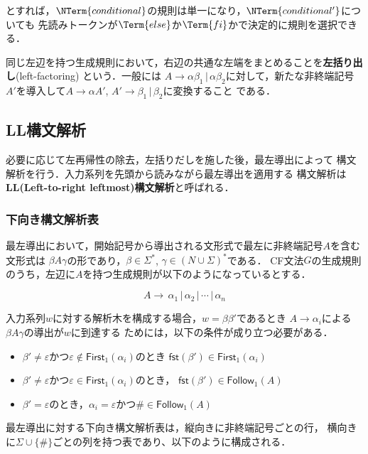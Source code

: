\documentclass[dvipdfmx,a4j]{jbook}
\begin{document}
とすれば，$\NTerm{conditional}$の規則は単一になり，$\NTerm{conditional'}$についても
先読みトークンが$\Term{else}$か$\Term{fi}$かで決定的に規則を選択できる．

同じ左辺を持つ生成規則において，右辺の共通な左端をまとめることを{\bf 左括り出し}(left-factoring)
という．一般には $A\rightarrow \alpha\beta_1\,|\,\alpha\beta_2$に対して，新たな非終端記号
$A'$を導入して$A\rightarrow \alpha A'$, $A'\rightarrow\beta_1\,|\,\beta_2$に変換すること
である．

\subsection{LL構文解析}

必要に応じて左再帰性の除去，左括りだしを施した後，最左導出によって
構文解析を行う．入力系列を先頭から読みながら最左導出を適用する
構文解析は{\bf LL(Left-to-right leftmost)構文解析}と呼ばれる．

\subsubsection{下向き構文解析表}

最左導出において，開始記号から導出される文形式で最左に非終端記号$A$を含む文形式は
$\beta A\gamma$の形であり，$\beta\in\Sigma^\ast$, $\gamma\in(N\cup\Sigma)^\ast$である．
CF文法$G$の生成規則のうち，左辺に$A$を持つ生成規則が以下のようになっているとする．

\[A\rightarrow\,\alpha_1\,|\,\alpha_2\,|\,\cdots\,|\,\alpha_n\]

入力系列$w$に対する解析木を構成する場合，$w=\beta\beta'$であるとき
$A\rightarrow\alpha_i$による$\beta A\gamma$の導出が$w$に到達する
ためには，以下の条件が成り立つ必要がある．

\begin{itemize}
  \item $\beta'\not=\varepsilon$かつ$\varepsilon\notin\mathsf{First}_1(\alpha_i)$のとき
  $\mathsf{fst}(\beta')\in\mathsf{First}_1(\alpha_i)$ 
  \item $\beta'\not=\varepsilon$かつ$\varepsilon\in\mathsf{First}_1(\alpha_i)$のとき，
  $\mathsf{fst}(\beta')\in\mathsf{Follow}_1(A)$
  \item $\beta'=\varepsilon$のとき，$\alpha_i=\varepsilon$かつ$\#\in\mathsf{Follow}_1(A)$
\end{itemize}

最左導出に対する下向き構文解析表は，縦向きに非終端記号ごとの行，
横向きに$\Sigma\cup\{\#\}$ごとの列を持つ表であり、以下のように構成される．
\end{document}
